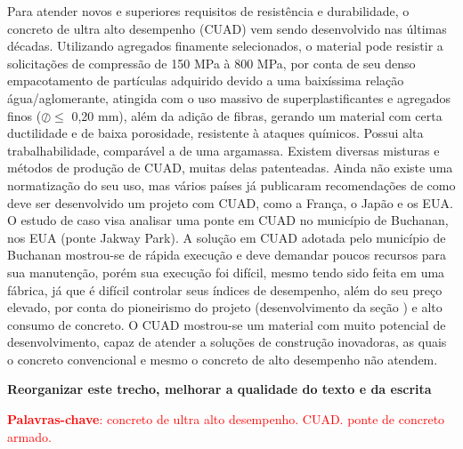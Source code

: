\documentclass[
	12pt,				%
	openright,			%
	twoside,			%
	a4paper,			%
	english,			%
	french,				%
	spanish,			%
	brazil				%
	]{abntex2}
\begin{document}
\setlength{\absparsep}{18pt} %
\begin{resumo}
 Para atender novos e superiores requisitos de resistência e durabilidade, o concreto de ultra alto desempenho (CUAD) vem sendo desenvolvido nas últimas décadas. Utilizando agregados finamente selecionados, o material pode resistir a solicitações de compressão de 150 MPa à 800 MPa, por conta de seu denso empacotamento de partículas adquirido devido a uma baixíssima relação água/aglomerante, atingida com o uso massivo de superplastificantes e agregados finos ($ \oslash \leq $ 0,20 mm), além da adição de fibras, gerando um material com certa  ductilidade e de baixa porosidade, resistente à ataques químicos. Possui alta trabalhabilidade, comparável a de uma argamassa. Existem diversas misturas e métodos de produção de CUAD, muitas delas patenteadas. Ainda não existe uma normatização do seu uso, mas vários países já publicaram recomendações de como deve ser desenvolvido um projeto com CUAD, como a França, o Japão e os EUA. O estudo de caso visa analisar uma ponte em CUAD no município de Buchanan, nos EUA (ponte Jakway Park). A solução em CUAD adotada pelo município de Buchanan mostrou-se de rápida execução e deve demandar poucos recursos para sua manutenção, porém sua execução foi difícil, mesmo tendo sido feita em uma fábrica, já que é difícil controlar seus índices de desempenho, além do seu preço elevado, por conta do pioneirismo do projeto (desenvolvimento da seção \textpi) e alto consumo de concreto. O CUAD mostrou-se um material com muito potencial de desenvolvimento, capaz de atender a soluções de construção inovadoras, as quais o concreto convencional e mesmo o concreto de alto desempenho não atendem.
 
 \textbf{Reorganizar este trecho, melhorar a qualidade do texto e da escrita}

 \textcolor{red}{\textbf{Palavras-chave}: concreto de ultra alto desempenho. CUAD. ponte de concreto armado.}
 
\end{resumo}
\end{document}
